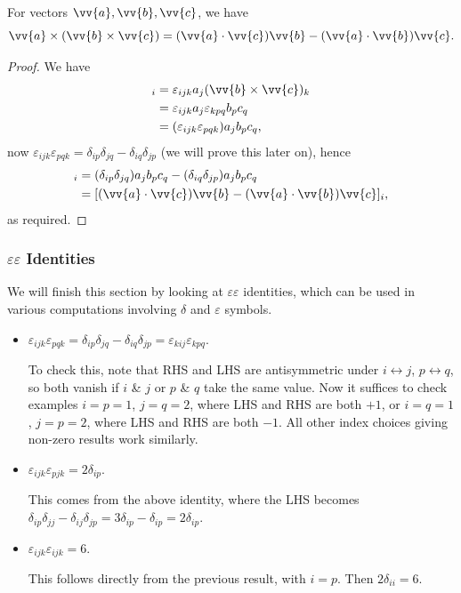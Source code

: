 \begin{proposition}
    For vectors $\vv{a}, \vv{b}, \vv{c}$, we have
    $$
    \vv{a} \times(\vv{b} \times \vv{c})=(\vv{a} \cdot \vv{c}) \vv{b}-(\vv{a} \cdot \vv{b}) \vv{c}.
    $$
\end{proposition}
\begin{proof}
We have
\begin{align*}
    [\vv{a} \times (\vv{b} \times \vv{c})]_i &= \varepsilon_{ijk} a_j (\vv{b} \times \vv{c})_k \\
        &= \varepsilon_{ijk} a_j \varepsilon_{kpq} b_p c_q \\
 &= (\varepsilon_{ijk}\varepsilon_{pqk}) a_j b_p c_q,
\end{align*}    
now $\varepsilon_{ijk}\varepsilon_{pqk} = \delta_{ip} \delta_{jq} - \delta_{iq} \delta_{jp}$ (we will prove this later on), hence
\begin{align*}
    [\vv{a} \times (\vv{b} \times \vv{c})]_i &= (\delta_{ip} \delta_{jq})a_j b_p c_q - (\delta_{iq} \delta_{jp}) a_j b_p c_q \\
    &= [(\vv{a} \cdot \vv{c})\vv{b} - (\vv{a} \cdot \vv{b})\vv{c}]_i,
\end{align*}
as required.
\end{proof}

\subsubsection{$\varepsilon \varepsilon$ Identities}

We will finish this section by looking at $\varepsilon \varepsilon$ identities, which can be used in various computations involving $\delta$ and $\varepsilon$ symbols.

\begin{itemize}
    \item $\varepsilon_{ijk}\varepsilon_{pqk} = \delta_{ip} \delta_{jq} - \delta_{iq} \delta_{jp} = \varepsilon_{kij} \varepsilon_{kpq}$.
    
    To check this, note that RHS and LHS are antisymmetric under $i \leftrightarrow j$, $p \leftrightarrow q$, so both vanish if $i$ \& $j$ or $p$ \& $q$ take the same value. Now it suffices to check examples $i = p = 1$, $j = q = 2$, where LHS and RHS are both $+1$, or $i = q = 1$, $j = p = 2$, where LHS and RHS are both $-1$. All other index choices giving non-zero results work similarly.

    \item $\varepsilon_{ijk} \varepsilon_{pjk} = 2 \delta_{ip}$.
    
    This comes from the above identity, where the LHS becomes $\delta_{ip} \delta_{jj} - \delta_{ij} \delta_{jp} = 3\delta_{ip} - \delta_{ip} = 2\delta_{ip}$.

    \item $\varepsilon_{ijk} \varepsilon_{ijk} = 6$.

    This follows directly from the previous result, with $i = p$. Then $2 \delta_{ii} = 6$.
\end{itemize}


